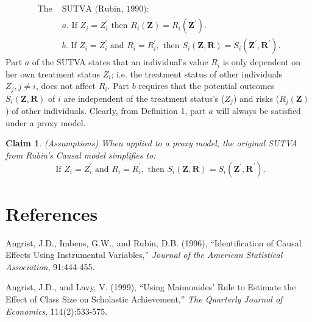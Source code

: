 \documentclass[12pt]{article}
\newtheorem{claim}{Claim}
\begin{document}
\begin{equation*}
\label{eq_sutva}
\begin{split}
\text{The }&\text{SUTVA (Rubin, 1990):}\\
& a. \text{ If } Z_{i} = Z_{i}^{\prime} \text{ then } R_{i}(\mathbf{Z}) = R_{i}(\mathbf{Z}^{\prime}).\\
& b. \text{ If } Z_{i} = Z_{i}^{\prime} \text{ and } R_i = R_{i}^{\prime}, \text{ then } S_{i}(\mathbf{Z}, \mathbf{R})=S_{i}(\mathbf{Z}^{\prime}, \mathbf{R}^{\prime}).
\end{split}
\end{equation*}
Part $a$ of the SUTVA states that an individual's value $R_i$ is only dependent on her own treatment status $Z_i$; i.e. the treatment status of other individuals $Z_j, j \neq i$, does not affect $R_i$. Part $b$ requires that the potential outcomes $S_{i}(\mathbf{Z}, \mathbf{R})$ of $i$ are independent of the treatment status's ($Z_j$) and risks ($R_{j}(\mathbf{Z})$) of other individuals. Clearly, from Definition 1, part $a$ will always be satisfied under a proxy model.
\begin{claim} (Assumptions) When applied to a proxy model, the original SUTVA from Rubin's Causal model simplifies to:
\begin{equation*}
\text{ If } Z_{i} = Z_{i}^{\prime} \text{ and } R_i = R_{i}^{\prime}, \text{ then } S_{i}(\mathbf{Z}, \mathbf{R})=S_{i}(\mathbf{Z}^{\prime}, \mathbf{R}^{\prime}).
\end{equation*}
\end{claim}


\newpage
\section*{References}
\begin{footnotesize}

\begin{description}

\item Angrist, J.D., Imbens, G.W., and Rubin, D.B. (1996), ``Identification of Causal Effects Using Instrumental Variables,'' \emph{Journal of the American Statistical Association}, 91:444-455. 

\item Angrist, J.D., and Lavy, V. (1999), ``Using Maimonides' Rule to Estimate the Effect of Class Size on Scholastic Achievement,'' \emph{The Quarterly Journal of Economics}, 114(2):533-575.


\end{description}
\end{footnotesize}\newpage
\end{document}
